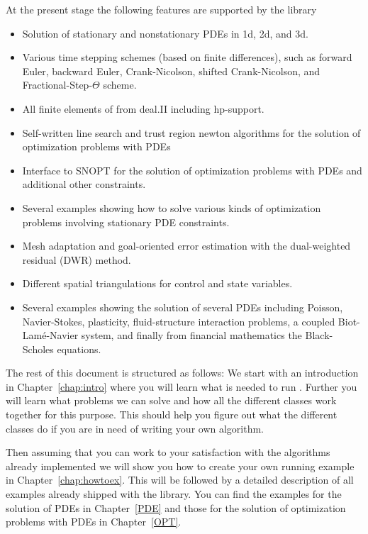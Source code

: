 At the present stage the following features are supported by the library
\begin{itemize}
\item Solution of stationary and nonstationary PDEs in 1d, 2d, and 3d.
\item Various time stepping schemes (based on finite differences), 
  such as forward Euler, backward Euler,
  Crank-Nicolson, shifted Crank-Nicolson, and Fractional-Step-$\Theta$ scheme.
\item All finite elements of from deal.II including hp-support.
\item Self-written line search and trust region newton algorithms for the 
   solution of optimization problems with PDEs \cite{NoWr00}
\item Interface to SNOPT for the solution of optimization problems with PDEs and
  additional other constraints.
\item Several examples showing how to solve various kinds of optimization problems
  involving stationary PDE constraints.
\item Mesh adaptation and goal-oriented error estimation with
the dual-weighted residual (DWR) method.
\item Different spatial triangulations for control and state variables.
\item Several examples showing the solution of several PDEs including
   Poisson, Navier-Stokes, plasticity, fluid-structure interaction problems,
a coupled Biot-Lam\'e-Navier system, and finally from financial mathematics
the Black-Scholes equations.
\end{itemize}


The rest of this document is structured as follows: We start with an introduction in
Chapter~\ref{chap:intro} where you will learn what is needed to run \dope{}. 
Further you will learn what problems we can solve and how all the different classes 
work together for this purpose. This should help you figure out what the different classes
do if you are in need of writing your own algorithm.

Then assuming that you can work to your satisfaction with the algorithms already implemented
we will show you how to create your own running example in Chapter~\ref{chap:howtoex}.
This will be followed by a detailed description of all examples already shipped with 
the library. You can find the examples for the solution of PDEs in Chapter~\ref{PDE}
and those for the solution of optimization problems with PDEs in Chapter~\ref{OPT}.

